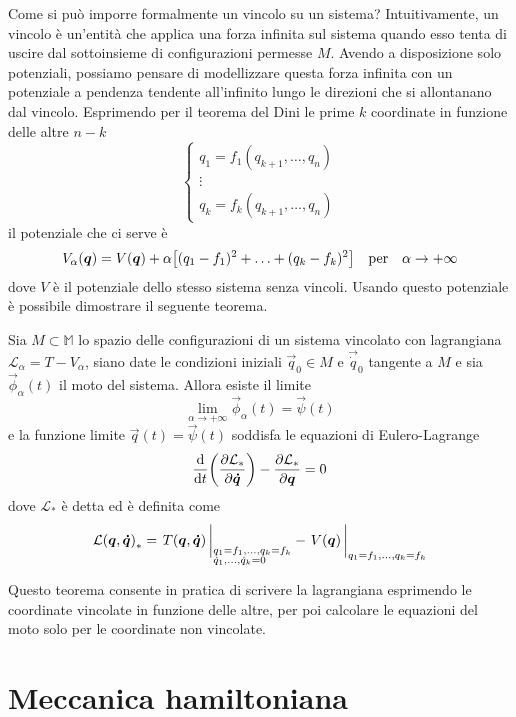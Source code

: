Come si può imporre formalmente un vincolo su un sistema? Intuitivamente, un vincolo è un'entità che applica una forza infinita sul sistema quando esso tenta di uscire dal sottoinsieme di configurazioni permesse $M$. Avendo a disposizione solo potenziali, possiamo pensare di modellizzare questa forza infinita con un potenziale a pendenza tendente all'infinito lungo le direzioni che si allontanano dal vincolo. Esprimendo per il teorema del Dini le prime $k$ coordinate in funzione delle altre $n-k$ \begin{equation}
\begin{cases}
  q_1 = f_1(q_{k+1}, \ldots, q_n) \\
  \vdots \\
  q_k = f_k(q_{k+1}, \ldots, q_n)
\end{cases}
\end{equation} 
il potenziale che ci serve è \begin{equation}
  V_{\alpha}(\vec{q}) = V(\vec{q}) + \alpha\big[(q_1-f_1)^2 + \ldots + (q_k-f_k)^2 \big] \qqtext{per} \alpha \to +\infty
\end{equation} 
dove $V$ è il potenziale dello stesso sistema senza vincoli. Usando questo potenziale è possibile dimostrare il seguente teorema.
\begin{theorem}
  Sia $M \subset \mathbb{M}$ lo spazio delle configurazioni di un sistema vincolato con lagrangiana $\mathcal{L}_{\alpha} = T -V_{\alpha}$, siano date le condizioni iniziali $\vec{q}_0 \in  M$ e $\vec{\dot{q}}_0$ tangente a $M$ e sia $\vec{\phi}_{\alpha}(t)$ il moto del sistema. Allora esiste il limite \begin{equation}
  \lim_{\alpha \to +\infty} \vec{\phi}_{\alpha}(t) = \vec{\psi}(t)
  \end{equation} 
  e la funzione limite $\vec{q}(t) = \vec{\psi}(t)$ soddisfa le equazioni di Eulero-Lagrange \begin{equation}
    \dv{t}(\pdv{\mathcal{L}_{*}}{\boldsymbol{\dot{q}}}) - \pdv{\mathcal{L}_{*}}{\boldsymbol{q}} = 0
  \end{equation} 
  dove $\mathcal{L}_*$ è detta  ed è definita come \begin{equation}
  \mathcal{L(\vec{q},\vec{\dot{q}})}_* = \eval{T(\vec{q},\vec{\dot{q}})\,}_{\begin{subarray}{l}
    q_1=f_1, \ldots, q_k=f_k \\
    \dot{q}_1, \ldots, \dot{q}_k = 0
  \end{subarray}} - \eval{V(\vec{q})\,}_{q_1=f_1, \ldots, q_k=f_k}
  \end{equation} 
\end{theorem}
Questo teorema consente in pratica di scrivere la lagrangiana esprimendo le coordinate vincolate in funzione delle altre, per poi calcolare le equazioni del moto solo per le coordinate non vincolate. 
\section{Meccanica hamiltoniana}